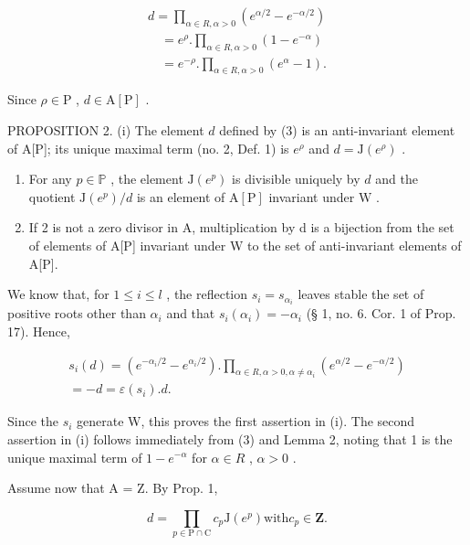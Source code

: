 \[
\begin{array}{l} d = \prod_ {\alpha \in R, \alpha > 0} (e ^ {\alpha / 2} - e ^ {- \alpha / 2}) \\ \quad = e ^ {\rho}. \prod_ {\alpha \in R, \alpha > 0} (1 - e ^ {- \alpha}) \\ \quad = e ^ {- \rho}. \prod_ {\alpha \in R, \alpha > 0} (e ^ {\alpha} - 1). \end{array}\tag{3}
\]

Since \(\rho \in \mathrm{P}\) , \(d \in \mathrm{A}[\mathrm{P}]\) .

PROPOSITION 2. (i) The element \(d\) defined by (3) is an anti-invariant element of A{[}P{]}; its unique maximal term (no. 2, Def. 1) is \(e^{\rho}\) and \(d = \mathrm{J}(e^{\rho})\) .

\begin{enumerate}
\def\labelenumi{(\roman{enumi})}
\setcounter{enumi}{1}
\item
  For any \(p \in \mathbb{P}\) , the element \(\mathrm{J}(e^p)\) is divisible uniquely by \(d\) and the quotient \(\mathrm{J}(e^p)/d\) is an element of \(\mathrm{A}[\mathrm{P}]\) invariant under \(\mathrm{W}\) .
\item
  If 2 is not a zero divisor in A, multiplication by d is a bijection from the set of elements of A{[}P{]} invariant under W to the set of anti-invariant elements of A{[}P{]}.
\end{enumerate}

We know that, for \(1 \leqslant i \leqslant l\) , the reflection \(s_i = s_{\alpha_i}\) leaves stable the set of positive roots other than \(\alpha_i\) and that \(s_i(\alpha_i) = -\alpha_i\) (§ 1, no. 6. Cor. 1 of Prop. 17). Hence,

\[
\begin{array}{l} s _ {i} (d) = (e ^ {- \alpha_ {i} / 2} - e ^ {\alpha_ {i} / 2}). \prod_ {\alpha \in R, \alpha > 0, \alpha \neq \alpha_ {i}} (e ^ {\alpha / 2} - e ^ {- \alpha / 2}) \\ = - d = \varepsilon (s _ {i}). d. \end{array}
\]

Since the \(s_{i}\) generate W, this proves the first assertion in (i). The second assertion in (i) follows immediately from (3) and Lemma 2, noting that 1 is the unique maximal term of \(1 - e^{-\alpha}\) for \(\alpha \in R\) , \(\alpha > 0\) .

Assume now that A = Z. By Prop. 1,

\[
d = \prod_ {p \in \mathrm{P} \cap \mathrm{C}} c _ {p} \mathrm{J} (e ^ {p}) \text {with} c _ {p} \in \mathbf {Z}.\tag{4}
\]

